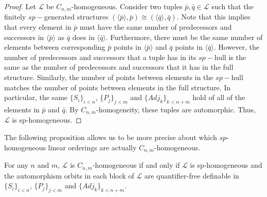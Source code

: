 \documentclass[11pt]{amsart}
\theoremstyle{definition}
\def\L{\mathcal L}
\begin{document}
\begin{proof}
    Let $\L$ be $C_{n,m}$-homogeneous.
    Consider two tuples $\bar{p},\bar{q}\in\L$ such that the finitely $sp-$generated structures $(\langle\bar{p}\rangle,\bar{p})\cong(\langle\bar{q}\rangle,\bar{q})$.
    Note that this implies that every element in $\bar{p}$ must have the same number of predecessors and successors in $\langle\bar{p}\rangle$ as $\bar{q}$ does in $\langle\bar{q}\rangle$.
    Furthermore, there must be the same number of elements between corresponding $\bar{p}$ points in $\langle\bar{p}\rangle$ and $\bar{q}$ points in $\langle\bar{q}\rangle$.
    However, the number of predecessors and successors that a tuple has in its $sp-$hull is the same as the number of predecessors and successors that it has in the full structure.
    Similarly, the number of points between elements in the $sp-$hull matches the number of points between elements in the full structure.
    In particular, the same $\{S_i\}_{i<n}$, $\{P_j\}_{j<m}$ and $\{Adj_k\}_{k< n+m}$ hold of all of the elements in $\bar{p}$ and $\bar{q}$.
    By $C_{n,m}$-homogeneity, these tuples are automorphic.
    Thus, $\L$ is sp-homogeneous.
\end{proof}

The following proposition allows us to be more precise about which $sp$-homogeneous linear orderings are actually $C_{n,m}$-homogeneous.

\begin{proposition}\label{prop:blockcriteria}
        For any $n$ and $m$, $\L$ is $C_{n,m}$-homogeneous if and only if $\L$ is sp-homogeneous and the automorphism orbits in each block of $\L$ are quantifier-free definable in $\{S_i\}_{i<n}$, $\{P_j\}_{j<m}$ and $\{Adj_k\}_{k<n+m}$.
\end{proposition}
\end{document}
